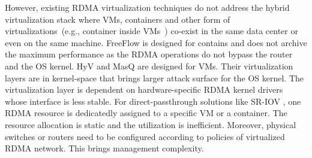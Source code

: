 
However, existing RDMA virtualization techniques do not address the hybrid virtualization stack where VMs, containers and other form of virtualizations~(e.g., container inside VMs~\cite{containeronvm}) co-exist in the same data center or even on the same machine.
FreeFlow \cite{kim2019freeflow} is designed for contains and does not archive the maximum performance as the RDMA operations do not bypass the router and the OS kernel.
HyV \cite{pfefferle2015hybrid} and MasQ \cite{he2020masq} are designed for VMs. Their virtualization layers are in kernel-space that brings larger attack surface for the OS kernel. The virtualization layer is dependent on hardware-specific RDMA kernel drivers whose interface is less stable. 
For direct-passthrough solutions like SR-IOV \cite{sr-iov}, one RDMA resource is dedicatedly assigned to a specific VM or a container. The resource allocation is static and the utilization is inefficient. Moreover, physical switches or routers need to be configured according to policies of virtualized RDMA network. This brings management complexity.%

